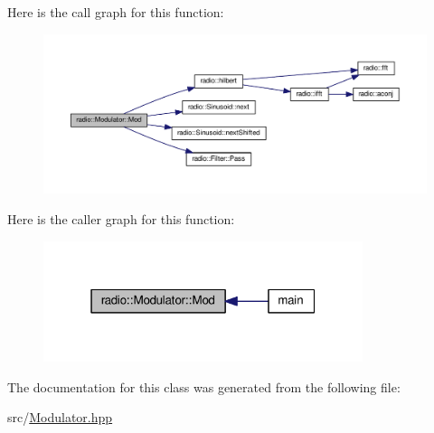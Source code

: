 Here is the call graph for this function\+:
\nopagebreak
\begin{figure}[H]
\begin{center}
\leavevmode
\includegraphics[width=350pt]{classradio_1_1Modulator_ab5eac6e4900579486b5871b48e64cdab_cgraph}
\end{center}
\end{figure}




Here is the caller graph for this function\+:
\nopagebreak
\begin{figure}[H]
\begin{center}
\leavevmode
\includegraphics[width=265pt]{classradio_1_1Modulator_ab5eac6e4900579486b5871b48e64cdab_icgraph}
\end{center}
\end{figure}




The documentation for this class was generated from the following file\+:\begin{DoxyCompactItemize}
\item 
src/\hyperlink{Modulator_8hpp}{Modulator.\+hpp}\end{DoxyCompactItemize}
